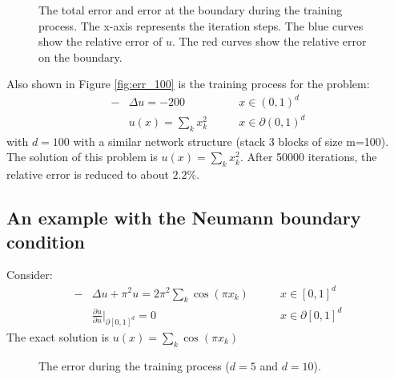 \documentclass[a4paper,12pt]{article}
\begin{document}


\begin{figure}[!h]
\centering
\vspace{2pt}
\vspace{3pt}

\caption{The total error and error at the boundary during the training 
process. The x-axis represents the iteration steps. 
The blue curves show the relative error of $u$.
The red curves show the relative error on the boundary. \label{fig:errk}
}
\end{figure}

Also shown in Figure  \ref{fig:err_100} is the training process for the
problem:
\begin{equation}
\begin{aligned}
-&\Delta u=-200 \qquad &x \in (0,1)^{d}\\
&u(x)=\sum_k x_k^2 \qquad &x \in \partial (0,1)^{d}
\end{aligned}
\end{equation}
with $d=100$ with a similar
network structure (stack 3 blocks of size m=100). The solution of this problem is $u(x)=\sum_k x_k^2$. After 50000 iterations, the relative error is reduced to about $2.2\%$.

\subsection{An example with the Neumann boundary condition}
Consider:
\begin{equation}
\begin{aligned}
-&\Delta u+\pi^2u=2\pi^2\sum_k \cos (\pi x_k) \qquad &x \in [0,1]^d\\
&\frac{\partial u}{\partial n}|_{\partial [0,1]^d}=0 &x \in \partial [0,1]^d
\end{aligned}
\end{equation}
The exact solution is $u(x)=\sum_k \cos(\pi x_k)$

\begin{figure}[!h]
\centering
\vspace{2pt}
\vspace{3pt}
\caption{The error during the training process ($d=5$ and $d=10$).\label{fig:Neumann}
}
\end{figure}
\end{document}
